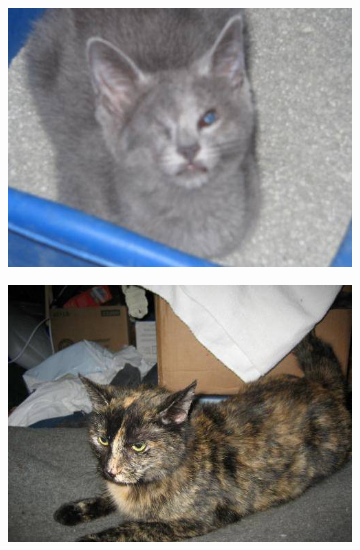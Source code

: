\begin{figure}
\centering
\begin{subfigure}[b]{.2\linewidth}
\includegraphics[width=\linewidth]{Figs/cat450.jpg}
\end{subfigure}
\begin{subfigure}[b]{.2\linewidth}
\includegraphics[width=\linewidth]{Figs/cat1921.jpg}
\end{subfigure}
\begin{subfigure}[b]{.2\linewidth}

\end{subfigure}
\end{figure}
